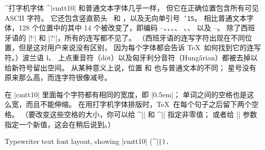 \noindent ^{打字机字体} ^|cmtt10| 和普通文本字体几乎一样，
但它在正确位置包含所有可见 ASCII 字符。
它还包含竖直箭头 \up\ 和 \dn ，以及无向单引号~{\tt\char'15}。
相比普通文本字体，128 个位置中的其中 14 个被改变了，即编码
--、、、、
、、 以及 --。
除了西班牙语的 |!`| 和 |?`|\thinspace ，所有的连写都不见了。%
（西班牙语的连写字符出现在不同位置，但是这对用户来说没有区别，
因为每个字体都会告诉 \TeX\ 如何找到它的连写符。）波兰语 \l 、
上点重音符（d\.ot）以及匈牙利分音符（Hung\H arian）都被去掉以给新符号留出空间。
从某种意义上说，位置  和  也与普通文本的不同；
星号没有原来那么高，而连字符很像减号。

在 |cmtt10| 里面每个字符都有相同的宽度，即 |0.5em|；
单词之间的空格也是这么宽，而且不能伸缩。
在用打字机字体排版时，\TeX\ 在每个句子之后留下两个空格。%
（要改变这些空格的大小，你可以给 ^|\spaceskip| 和 ^|\xspaceskip| 指定非零值；
或者给 |\fontdimen| 参数指定一个新值，这会在稍后说到。）

\medskip\vfill
{}Typewriter text font layout,
showing |cmtt10| (^|\tt|).
\beginchart\tentt
\normalchart
\endchart

